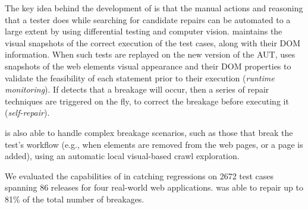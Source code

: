 

The key idea behind the development of \tool is that the manual actions and reasoning that a tester does while searching for candidate repairs can be automated to a large extent by using differential testing and computer vision. 
\tool maintains the visual snapshots of the correct execution of the test cases, along with their DOM information. When such tests are replayed on the new version of the AUT, \tool uses snapshots of the web elements visual appearance and their DOM properties to validate the feasibility of each statement prior to their execution (\textit{runtime monitoring}). If \tool detects that a breakage will occur, then a series of repair techniques are triggered on the fly, to correct the breakage before executing it (\textit{self-repair}).

\tool is also able to handle complex breakage scenarios, such as those that break the test's workflow (e.g., when elements are removed from the web pages, or a page is added), using an automatic local visual-based crawl exploration.

We evaluated the capabilities of \tool in catching regressions on 2672 test cases spanning 86 releases for four real-world web applications. \tool was able to repair up to 81\% of the total number of breakages. 

